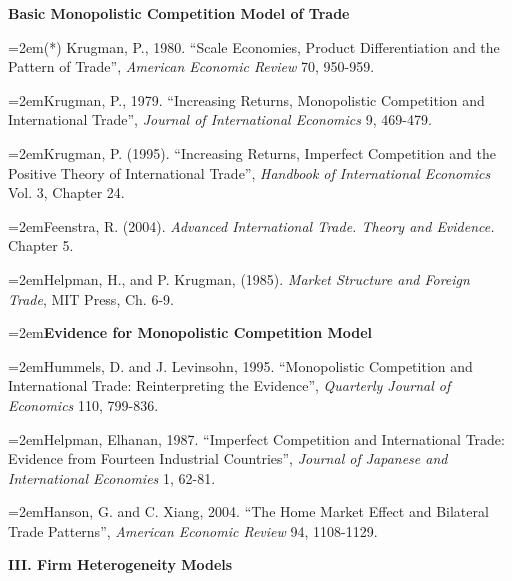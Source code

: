 \documentclass[10pt]{article}
\newcommand{\reading}{\par\hangindent=2em\hangafter=1\noindent}
\newenvironment{readingsblock}{%
  \begin{adjustwidth}{2em}{0pt} %
}{%
  \end{adjustwidth}
}
\begin{document}
\begin{readingsblock}

\noindent \textbf{Basic Monopolistic Competition Model of Trade} \\[4pt]

\reading (*) Krugman, P., 1980. ``Scale Economies, Product Differentiation and the Pattern of Trade'', {\it American Economic Review} 70, 950-959.

\reading Krugman, P., 1979. ``Increasing Returns, Monopolistic Competition and International Trade'', {\it Journal of International Economics} 9, 469-479.

\reading Krugman, P. (1995). ``Increasing Returns, Imperfect Competition and the Positive Theory of International Trade'', {\it Handbook of International Economics} Vol. 3, Chapter 24.

\reading Feenstra, R. (2004). {\it Advanced International Trade. Theory and Evidence.} Chapter 5.

\reading Helpman, H., and P. Krugman, (1985). {\it Market Structure and Foreign Trade}, MIT Press, Ch. 6-9.\\[4pt]

\reading \textbf{Evidence for Monopolistic Competition Model} \\[4pt]

\reading Hummels, D. and J. Levinsohn, 1995. “Monopolistic Competition and International Trade: Reinterpreting the Evidence”, {\it Quarterly Journal of Economics} 110, 799-836.

\reading Helpman, Elhanan, 1987. “Imperfect Competition and International Trade: Evidence from Fourteen Industrial Countries”, {\it Journal of Japanese and International Economies} 1, 62-81.

\reading Hanson, G. and C. Xiang, 2004. “The Home Market Effect and Bilateral Trade Patterns”, {\it American Economic Review} 94, 1108-1129.\\[4pt]
\end{readingsblock}





\noindent \textbf{III. Firm Heterogeneity Models} \\[6pt]
\end{document}
